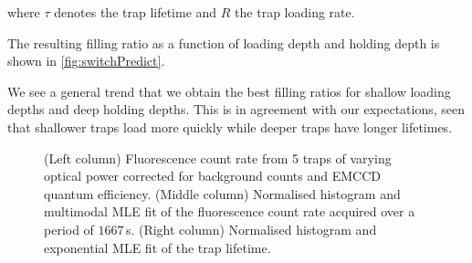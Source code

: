 \documentclass[../Thesis-IJspeert.tex]{subfiles}
\begin{document}
where $\tau$ denotes the trap lifetime and $R$ the trap loading rate.

The resulting filling ratio as a function of loading depth and holding depth is shown in \cref{fig:switchPredict}.


We see a general trend that we obtain the best filling ratios for shallow loading depths and deep holding depths. This is in agreement with our expectations, seen that shallower traps load more quickly while deeper traps have longer lifetimes. 

\begin{figure}[!t]
	\centering
	\caption[An example of a floating figure]{(Left column) Fluorescence count rate from 5 traps of varying optical power corrected for background counts and EMCCD quantum efficiency. (Middle column) Normalised histogram and multimodal MLE fit of the fluorescence count rate acquired over a period of $1667\,$s. (Right column) Normalised histogram and exponential MLE fit of the trap lifetime.} %
	\label{masterplot} 
\end{figure}
\end{document}
